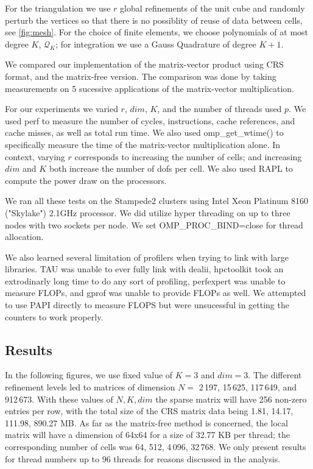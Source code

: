 \documentclass[12pt]{article}
\begin{document}
For the triangulation we use $r$ global refinements of the unit cube and randomly perturb the vertices so that there is no possiblity of reuse of data between cells, see \ref{fig:mesh}. For the choice of finite elements, we choose polynomials of at most degree $K$, $\mathcal{Q}_{K}$; for integration we use a Gauss Quadrature of degree $K+1$. 

We compared our implementation of the matrix-vector product using CRS format, and the matrix-free version. The comparison was done by taking measurements on 5 sucessive applications of the matrix-vector multiplication.

For our experiments we varied $r$, $dim$, $K$, and the number of threads used $p$. We used perf to measure the number of cycles, instructions, cache references, and cache misses, as well as total run time. We also used omp\_get\_wtime() to specifically measure the time of the matrix-vector multiplication alone. In context, varying $r$ corresponds to increasing the number of cells; and increasing $dim$ and $K$ both increase the number of dofs per cell. We also used RAPL to compute the power draw on the processors.

We ran all these tests on the Stampede2 clusters using Intel Xeon Platinum 8160 ("Skylake") 2.1GHz processor. We did utilize hyper threading on up to three nodes with two sockets per node. We set OMP\_PROC\_BIND=close for thread allocation.

We also learned several limitation of profilers when trying to link with large libraries. TAU was unable to ever fully link with dealii, hpctoolkit took an extrodinarly long time to do any sort of profiling, perfexpert was unable to measure FLOPs, and gprof was unable to provide FLOPs as well. We attempted to use PAPI directly to measure FLOPS but were unsucessful in getting the counters to work properly.


\subsection{Results}
In the following figures, we use fixed value of $K = 3$ and $dim = 3$. The different refinement levels led to matrices of dimension $N =$ 2\,197, 15\,625, 117\,649, and 912\,673. With these values of $N, K, dim$ the sparse matrix will have 256 non-zero entries per row, with the total size of the CRS matrix data being 1.81, 14.17, 111.98, 890.27 MB. As far as the matrix-free method is concerned, the local matrix will have a dimension of 64x64 for a size of 32.77 KB per thread; the corresponding number of cells was 64, 512, 4\,096, 32\,768. We only present results for thread numbers up to 96 threads for reasons discussed in the analysis.
\end{document}

